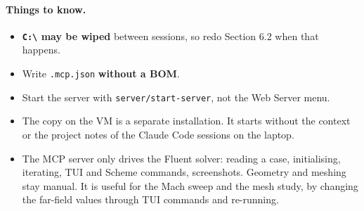 \documentclass[11pt]{article}
\begin{document}
\paragraph{Things to know.}
\begin{itemize}
\item \textbf{\texttt{C:\textbackslash} may be wiped} between sessions, so redo Section 6.2 when that happens.
\item Write \texttt{.mcp.json} \textbf{without a BOM}.
\item Start the server with \texttt{server/start-server}, not the Web Server menu.
\item The copy on the VM is a separate installation. It starts without the context or the project notes
of the Claude Code sessions on the laptop.
\item The MCP server only drives the Fluent solver: reading a case, initialising, iterating, TUI and
Scheme commands, screenshots. Geometry and meshing stay manual. It is useful for the Mach sweep and the
mesh study, by changing the far-field values through TUI commands and re-running.
\end{itemize}
\end{document}
